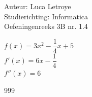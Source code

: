 \documentclass[a4paper]{article}
\begin{document}
  
\noindent \large Auteur: Luca Letroye        \\
\noindent \large Studierichting: Informatica \\
\noindent \large Oefeningenreeks 3B nr. 1.4 \\

\medskip

\normalsize

$f(x) = 3x^2 - \dfrac{1}{4}x +5$\\

$f'(x) = 6x - \dfrac{1}{4}$\\

$f''(x) = 6$\\




\begin{thebibliography}{999}
\end{thebibliography}
\end{document}
